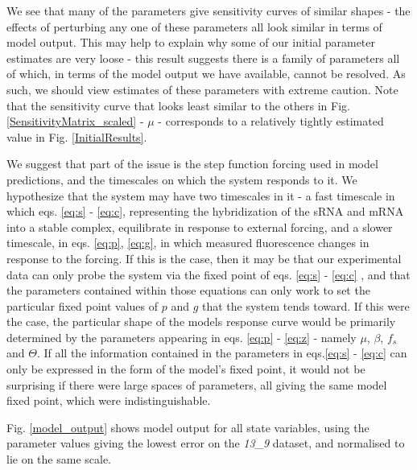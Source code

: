 \documentclass[10pt,journal]{./IEEE_latex_class/IEEEtran}
\begin{document}
We see that many of the parameters give sensitivity curves of similar shapes - the effects of perturbing any one of these parameters all look similar in terms of model output. This may help to explain why some of our initial parameter estimates are very loose - this result suggests there is a family of parameters all of which, in terms of the model output we have available, cannot be resolved. As such, we should view estimates of these parameters with extreme caution. Note that the sensitivity curve that looks least similar to the others in Fig. \ref{SensitivityMatrix_scaled} - $\mu$ - corresponds to a relatively tightly estimated value in Fig. \ref{InitialResults}.
 

We suggest that part of the issue is the step function forcing used in model predictions, and the timescales on which the system responds to it. We hypothesize that the system may have two timescales in it - a fast timescale in which eqs. \ref{eq:s} - \ref{eq:c}, representing the hybridization of the sRNA and mRNA into a stable complex, equilibrate in response to external forcing, and a slower timescale, in eqs. \ref{eq:p}, \ref{eq:g}, in which measured fluorescence changes in response to the forcing. If this is the case, then it may be that our experimental data can only probe the system via the fixed point of eqs. \ref{eq:s} - \ref{eq:c} , and that the parameters contained within those equations can only work to set the particular fixed point values of $p$ and $g$ that the system tends toward. If this were the case, the particular shape of the models response curve would be primarily determined by the parameters appearing in eqs. \ref{eq:p} - \ref{eq:z} - namely $\mu$, $\beta$, $f_{s}$ and $\Theta$. If all the information contained in the parameters in eqs.\ref{eq:s} - \ref{eq:c} can only be expressed in the form of the model's fixed point, it would not be surprising if there were large spaces of parameters, all giving the same model fixed point, which were indistinguishable. 

Fig. \ref{model_output} shows model output for all state variables, using the parameter values giving the lowest error on the \textit{13\_9} dataset, and normalised to lie on the same scale. 
\end{document}

